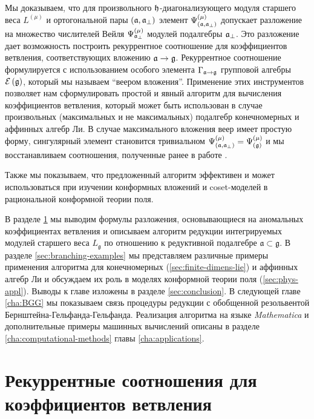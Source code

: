 Мы доказываем, что для произвольного $\mathfrak{h}$-диагонализующего модуля старшего веса $L^{\left( \mu \right)}$ и ортогональной пары $\left(  \mathfrak{a}, \mathfrak{a}_{\perp} \right)$ элемент
$\Psi ^{\left( \mu \right) }_{\left(  \mathfrak{a}, \mathfrak{a}_{\perp} \right)}$ допускает разложение на множество числителей Вейля $\Psi ^{\left( \mu \right) }_{ \mathfrak{a}_{\perp} }$ модулей подалгебры $\mathfrak{a}_{\perp}$.
Это разложение дает возможность построить рекуррентное соотношение для коэффициентов ветвления, соответствующих вложению $\mathfrak{a} \rightarrow \mathfrak{g} $. Рекуррентное соотношение формулируется с использованием особого элемента  $\Gamma_{\mathfrak{a} \rightarrow \mathfrak{g}}$ групповой алгебры
$\mathcal{E}\left( \mathfrak{g} \right)$, который мы называем ``веером вложения''. 
Применение этих инструментов позволяет нам сформулировать простой и явный алгоритм для вычисления коэффициентов ветвления, который может быть использован в случае произвольных (максимальных и не максимальных) подалгебр конечномерных и аффинных алгебр Ли. 
В случае максимального вложения веер имеет простую форму, сингулярный элемент становится тривиальном $\Psi ^{\left( \mu \right) }_{\left(  \mathfrak{a}, \mathfrak{a}_{\perp} \right)}=\Psi ^{\left( \mu \right) }_{\left(  \mathfrak{g}\right)}$ и мы восстанавливаем соотношения, полученные ранее в работе \cite{ilyin812pbc}.

Также мы показываем, что предложенный алгоритм эффективен и может использоваться при изучении конформных вложений и coset-моделей в рациональной конформной теории поля.

В разделе \ref{sec:branching} мы выводим формулы разложения, основывающиеся на аномальных коэффициентах ветвления и описываем алгоритм редукции интегрируемых модулей старшего веса $L_{\mathfrak{g}}$ по отношению к редуктивной подалгебре  $\mathfrak{a}\subset \mathfrak{g}$. В разделе \ref{sec:branching-examples} мы представляем различные примеры применения алгоритма для конечномерных (\ref{sec:finite-dimens-lie}) и аффинных алгебр Ли и обсуждаем их роль в моделях конформной теории поля (\ref{sec:phys-appl}). Выводы к главе изложены в разделе \ref{sec:conclusion}. В следующей главе \ref{cha:BGG} мы показываем связь процедуры редукции с обобщенной резольвентой Бернштейна-Гельфанда-Гельфанда.  Реализация алгоритма на языке {\it Mathematica} и дополнительные примеры машинных вычислений описаны в разделе \ref{cha:computational-methods} главы \ref{cha:applications}. 


\section{Рекуррентные соотношения для коэффициентов ветвления}
\label{sec:branching}

